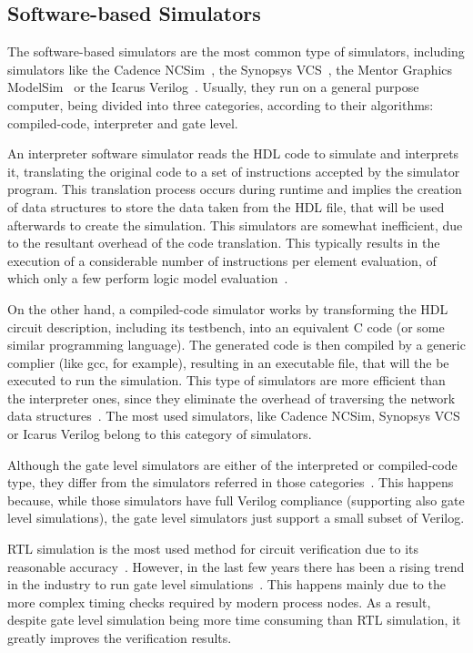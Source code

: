 \subsection{Software-based Simulators}
\label{subsection:software}

The software-based simulators are the most common type of simulators, including
simulators like the Cadence NCSim~\cite{cadence:ncsim}, the Synopsys
VCS~\cite{synopsys:vcs}, the Mentor Graphics ModelSim~\cite{mentor:modelsim} or
the Icarus Verilog~\cite{icarus:verilog}. Usually, they run on a general purpose
computer, being divided into three categories, according to their algorithms:
compiled-code, interpreter and gate level.

An interpreter software simulator reads the HDL code to simulate and interprets
it, translating the original code to a set of instructions accepted by the
simulator program. This translation process occurs during runtime and implies
the creation of data structures to store the data taken from the HDL file, that
will be used afterwards to create the simulation. This simulators are somewhat
inefficient, due to the resultant overhead of the code translation. This
typically results in the execution of a considerable number of instructions per
element evaluation, of which only a few perform logic model evaluation~\cite{lewis:compiled}.

On the other hand, a compiled-code simulator works by transforming the HDL
circuit description, including its testbench, into an equivalent C code (or some
similar programming language). The generated code is then compiled by a generic
complier (like gcc, for example), resulting in an executable file, that will the
be executed to run the simulation. This type of simulators are more efficient
than the interpreter ones, since they eliminate the overhead of traversing the
network data structures~\cite{lewis:compiled}. The most used simulators, like
Cadence NCSim, Synopsys VCS or Icarus Verilog belong to this category of
simulators.

Although the gate level simulators are either of the interpreted or
compiled-code type, they differ from the simulators referred in those
categories~\cite{tan:vhstas}. This happens because, while those simulators have
full Verilog compliance (supporting also gate level simulations), the gate level
simulators just support a small subset of Verilog.

RTL simulation is the most used method for circuit verification due to its
reasonable accuracy~\cite{sousa:reconfigurable}. However, in the last few years
there has been a rising trend in the industry to run gate level
simulations~\cite{khandelwal:gatelevel}. This happens mainly due to the more
complex timing checks required by modern process nodes. As a result, despite
gate level simulation being more time consuming than RTL simulation, it greatly
improves the verification results.

